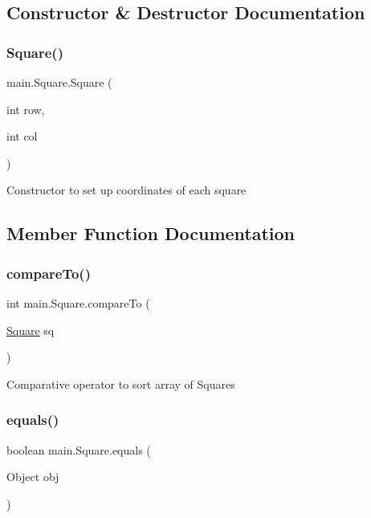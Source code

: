 \subsection{Constructor \& Destructor Documentation}
\mbox{\label{classmain_1_1_square_a52d3cfb1051c70b9d4e93b0d2a61139d}} 
\subsubsection{\texorpdfstring{Square()}{Square()}}
{\footnotesize\ttfamily main.\+Square.\+Square (\begin{DoxyParamCaption}\item[{int}]{row,  }\item[{int}]{col }\end{DoxyParamCaption})\hspace{0.3cm}{\ttfamily [inline]}}

Constructor to set up coordinates of each square 

\subsection{Member Function Documentation}
\mbox{\label{classmain_1_1_square_a7510832ff95defe547865c5869bd591a}} 
\subsubsection{\texorpdfstring{compare\+To()}{compareTo()}}
{\footnotesize\ttfamily int main.\+Square.\+compare\+To (\begin{DoxyParamCaption}\item[{\hyperlink{classmain_1_1_square}{Square}}]{sq }\end{DoxyParamCaption})\hspace{0.3cm}{\ttfamily [inline]}}

Comparative operator to sort array of Squares \mbox{\label{classmain_1_1_square_ae5859b983c912011a6adfc679abc8ff1}} 
\subsubsection{\texorpdfstring{equals()}{equals()}}
{\footnotesize\ttfamily boolean main.\+Square.\+equals (\begin{DoxyParamCaption}\item[{Object}]{obj }\end{DoxyParamCaption})\hspace{0.3cm}{\ttfamily [inline]}}

